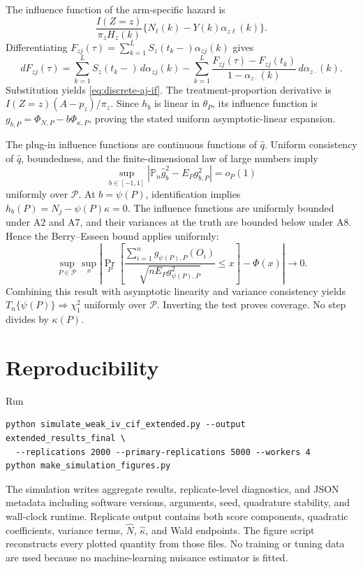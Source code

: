 \documentclass[
  10pt,
  letterpaper,
]{article}
\begin{document}
The influence function of the arm-specific hazard is
\[
\frac{I(Z=z)}{\pi_zH_z(k)}
\{N_\ell(k)-Y(k)\alpha_{z\ell}(k)\}.
\]
Differentiating
$F_{zj}(\tau)=\sum_{k=1}^L S_z(t_k-)\alpha_{zj}(k)$ gives
\[
dF_{zj}(\tau)
=\sum_{k=1}^L S_z(t_k-)\,d\alpha_{zj}(k)
-\sum_{k=1}^L
\frac{F_{zj}(\tau)-F_{zj}(t_k)}
{1-\alpha_{z\cdot}(k)}\,d\alpha_{z\cdot}(k).
\]
Substitution yields \eqref{eq:discrete-aj-if}. The
treatment-proportion derivative is $I(Z=z)(A-p_z)/\pi_z$. Since $h_b$
is linear in $\theta_P$, its influence function is
$g_{b,P}=\Phi_{N,P}-b\Phi_{\kappa,P}$, proving the stated uniform
asymptotic-linear expansion.

The plug-in influence functions are continuous functions of
$\widehat q$. Uniform consistency of $\widehat q$, boundedness, and the
finite-dimensional law of large numbers imply
\[
\sup_{b\in[-1,1]}
\left|\mathbb P_n\widehat g_b^2-E_Pg_{b,P}^2\right|=o_P(1)
\]
uniformly over $\mathcal P$. At $b=\psi(P)$, identification implies
$h_b(P)=N_j-\psi(P)\kappa=0$. The influence functions are uniformly
bounded under A2 and A7, and their variances at the truth are bounded
below under A8. Hence the Berry--Esseen bound applies uniformly:
\[
\sup_{P\in\mathcal P}\sup_x
\left|
\Pr_P\!\left[
\frac{\sum_{i=1}^n g_{\psi(P),P}(O_i)}
{\sqrt{nE_Pg_{\psi(P),P}^2}}\le x
\right]-\Phi(x)
\right|\longrightarrow0.
\]
Combining this result with asymptotic linearity and variance consistency
yields $T_n\{\psi(P)\}\Rightarrow\chi^2_1$ uniformly over
$\mathcal P$. Inverting the test proves coverage. No step divides by
$\kappa(P)$.

\section{Reproducibility}

Run
\begin{verbatim}
python simulate_weak_iv_cif_extended.py --output extended_results_final \
  --replications 2000 --primary-replications 5000 --workers 4
python make_simulation_figures.py
\end{verbatim}
The simulation writes aggregate results, replicate-level diagnostics,
and JSON metadata including software versions, arguments, seed,
quadrature stability, and wall-clock runtime. Replicate output contains
both score components, quadratic coefficients, variance terms,
$\widehat N$, $\widehat\kappa$, and Wald endpoints. The figure script
reconstructs every plotted quantity from those files. No training or
tuning data are used because no machine-learning nuisance estimator is
fitted.
\end{document}
